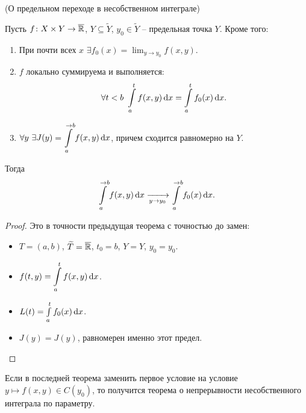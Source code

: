 \begin{theorem}(О предельном переходе в несобственном интеграле)
    
    Пусть $f \colon X \times Y \to \overline{\mathbb{R}}$, $Y \subseteq \widetilde{Y}$, $y_0 \in \widetilde{Y}$ --
    предельная точка $Y$. Кроме того:
    \begin{enumerate}
        \item При почти всех $x$ $\displaystyle \exists f_0(x) = \lim_{y \to y_0}{f(x, y)}$.
        \item $f$ локально суммируема и выполняется: 
            \[
                \forall t < b~ \int\limits_a^t{f(x, y) \,\mathrm{d} x} = \int\limits_a^t{f_0(x) \,\mathrm{d} x}
            .\]
        \item $\displaystyle \forall y~ \exists J(y) = \int\limits_a^{\to b}{f(x, y) \,\mathrm{d} x}$, причем
            сходится равномерно на $Y$.
    \end{enumerate}
    Тогда
    \[
        \int\limits_a^{\to b}{f(x, y) \,\mathrm{d} x} \xrightarrow[y \to y_0]{} \int\limits_a^{\to b}{f_0(x) \,\mathrm{d} x}
    .\]
\end{theorem}
\begin{proof}
    Это в точности предыдущая теорема с точностью до замен:
    \begin{itemize}
        \item $T = (a, b)$, $\widetilde{T} = \overline{\mathbb{R}}$, $t_0 = b$, $Y = Y$, $y_0 = y_0$.
        \item $\displaystyle f(t, y) = \int\limits_a^t{f(x, y) \,\mathrm{d} x}$.
        \item $L(t) = \int\limits_a^t{f_0(x) \,\mathrm{d} x}$.
        \item $J(y) = J(y)$, равномерен именно этот предел.
    \end{itemize}
\end{proof}

\begin{corollary}
    Если в последней теорема заменить первое условие на условие $y \mapsto f(x, y) \in C(y_0)$, 
    то получится теорема о непрерывности несобственного интеграла по параметру. 
\end{corollary}

